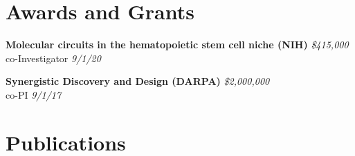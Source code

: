 \documentclass[11pt,a4paper,]{awesome-cv}
\begin{document}
\hypertarget{awards-and-grants}{%
\section{Awards and Grants}\label{awards-and-grants}}

\textbf{{Molecular circuits in the hematopoietic stem cell niche (NIH)}}
\hfill \emph{\$415,000}\\
co-Investigator \hfill \emph{9/1/20}

\textbf{{Synergistic Discovery and Design (DARPA)}}
\hfill \emph{\$2,000,000}\\
co-PI \hfill \emph{9/1/17}

\hypertarget{publications}{%
\section{Publications}\label{publications}}
\end{document}
